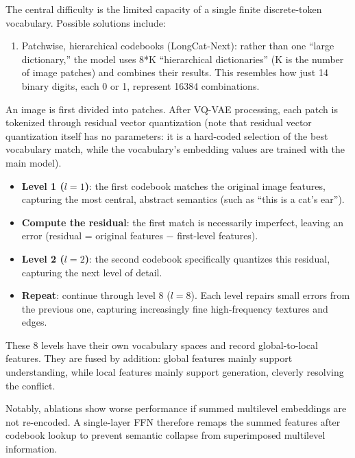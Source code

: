 The central difficulty is the limited capacity of a single finite discrete-token vocabulary. Possible solutions include:

\begin{enumerate}
\def\labelenumi{\arabic{enumi}.}
\tightlist
\item
  Patchwise, hierarchical codebooks (LongCat-Next): rather than one ``large dictionary,'' the model uses 8*K ``hierarchical dictionaries'' (K is the number of image patches) and combines their results. This resembles how just 14 binary digits, each 0 or 1, represent 16384 combinations.
\end{enumerate}

An image is first divided into patches. After VQ-VAE processing, each patch is tokenized through residual vector quantization (note that residual vector quantization itself has no parameters: it is a hard-coded selection of the best vocabulary match, while the vocabulary's embedding values are trained with the main model).

\begin{itemize}
\tightlist
\item
  \textbf{Level 1 (\(l=1\))}: the first codebook matches the original image features, capturing the most central, abstract semantics (such as ``this is a cat's ear'').
\item
  \textbf{Compute the residual}: the first match is necessarily imperfect, leaving an error (residual = original features − first-level features).
\item
  \textbf{Level 2 (\(l=2\))}: the second codebook specifically quantizes this residual, capturing the next level of detail.
\item
  \textbf{Repeat}: continue through level 8 (\(l=8\)). Each level repairs small errors from the previous one, capturing increasingly fine high-frequency textures and edges.
\end{itemize}

These 8 levels have their own vocabulary spaces and record global-to-local features. They are fused by addition: global features mainly support understanding, while local features mainly support generation, cleverly resolving the conflict.

Notably, ablations show worse performance if summed multilevel embeddings are not re-encoded. A single-layer FFN therefore remaps the summed features after codebook lookup to prevent semantic collapse from superimposed multilevel information.

